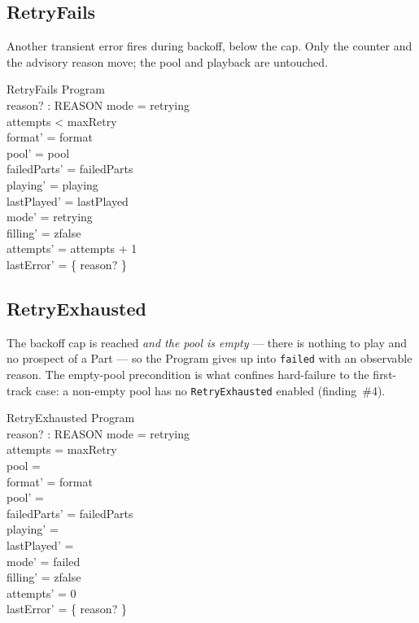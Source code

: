 \documentclass[a4paper,10pt,fleqn]{article}
\begin{document}
\subsection{RetryFails}

Another transient error fires during backoff, below the cap. Only the counter
and the advisory reason move; the pool and playback are untouched.

\begin{schema}{RetryFails}
  \Delta Program \\
  reason? : REASON
  \where
  mode = retrying \\
  attempts < maxRetry \\
  format' = format \\
  pool' = pool \\
  failedParts' = failedParts \\
  playing' = playing \\
  lastPlayed' = lastPlayed \\
  mode' = retrying \\
  filling' = zfalse \\
  attempts' = attempts + 1 \\
  lastError' = \{ reason? \}
\end{schema}

\subsection{RetryExhausted}

The backoff cap is reached \emph{and the pool is empty} --- there is nothing to
play and no prospect of a Part --- so the Program gives up into \texttt{failed}
with an observable reason. The empty-pool precondition is what confines
hard-failure to the first-track case: a non-empty pool has no
\texttt{RetryExhausted} enabled (finding~\#4).

\begin{schema}{RetryExhausted}
  \Delta Program \\
  reason? : REASON
  \where
  mode = retrying \\
  attempts = maxRetry \\
  pool = \emptyset \\
  format' = format \\
  pool' = \emptyset \\
  failedParts' = failedParts \\
  playing' = \emptyset \\
  lastPlayed' = \emptyset \\
  mode' = failed \\
  filling' = zfalse \\
  attempts' = 0 \\
  lastError' = \{ reason? \}
\end{schema}
\end{document}
